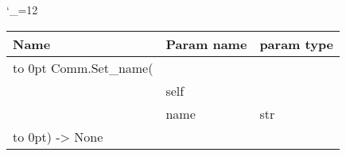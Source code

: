\begingroup \catcode`\_=12 \tt
\begin{tabular}{lll}
\toprule
\textrm{Name}&\textrm{Param name}&\textrm{param type}\\
\midrule
\hbox to 0pt {Comm.Set_name(\hss}\\
& self\\
& name & str\\
\hbox to 0pt{) -> None\hss}\\
\bottomrule
\end{tabular}
\endgroup
